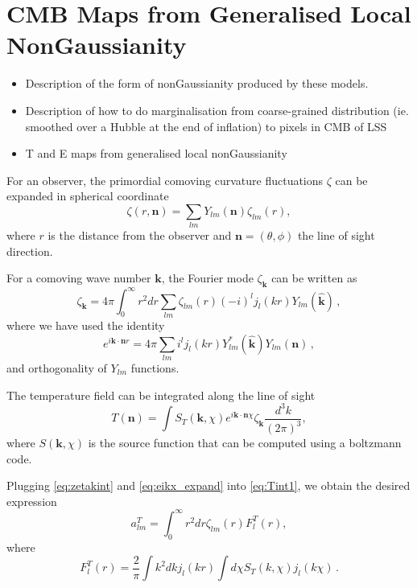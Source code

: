 \section{CMB Maps from Generalised Local NonGaussianity}
\begin{itemize}
\item Description of the form of nonGaussianity produced by these models.
\item Description of how to do marginalisation from coarse-grained distribution (ie. smoothed over a Hubble at the end of inflation) to pixels in CMB of LSS
\item T and E maps from generalised local nonGaussianity
\end{itemize}

For an observer,  the primordial comoving curvature fluctuations  $\zeta$ can be expanded in spherical coordinate 
\begin{equation}
  \zeta(r, \mathbf{n}) = \sum_{lm} Y_{lm}(\mathbf{n})\zeta_{lm}(r),
\end{equation}
where $r$ is the distance from the observer and $\mathbf{n} = (\theta, \phi)$ the line of sight direction.

 For a comoving wave number $\mathbf{k}$, the Fourier mode $\zeta_{\mathbf{k}}$ can be written as
\begin{equation}
  \zeta_{\mathbf{k}} = 4\pi \int_0^\infty r^2dr\sum_{lm}\zeta_{lm}(r) (-i)^l j_l(kr) Y_{lm}(\hat{\mathbf{k}})\, , \label{eq:zetakint}
\end{equation}
where we have used the identity
\begin{equation}
  e^{i\mathbf{k}\cdot\mathbf{n}r} = 4\pi \sum_{lm}i^l j_l(kr) Y^*_{lm}(\hat{\mathbf{k}}) Y_{lm}(\mathbf{n}) \, , \label{eq:eikx_expand}
\end{equation}
and orthogonality of $Y_{lm}$ functions.


The temperature field can be integrated along the line of sight
\begin{equation}
T({\mathbf{n}}) = \int S_T(\mathbf{k}, \chi) e^{i \mathbf{k}\cdot\mathbf{n} \chi}\zeta_{\mathbf{k}}\frac{d^3k}{(2\pi)^3}, \label{eq:Tint1}
\end{equation}
where $S(\mathbf{k}, \chi)$ is the source function that can be computed using a boltzmann code.

Plugging \eqref{eq:zetakint} and \eqref{eq:eikx_expand} into \eqref{eq:Tint1}, we obtain the desired expression
\begin{equation}
a_{lm}^T = \int_0^\infty r^2dr \zeta_{lm}(r) F^T_l(r),
\end{equation}
where
\begin{equation}
F^T_l(r) = \frac{2}{\pi} \int k^2dk j_l(kr) \int d\chi S_T(k, \chi) j_l(k\chi) \, .
\end{equation}
